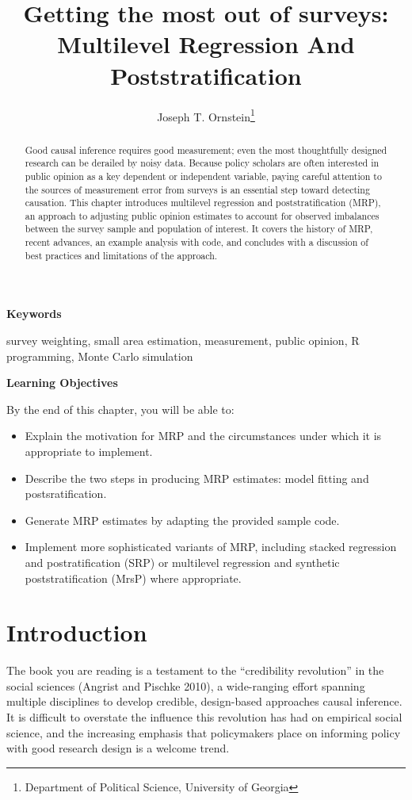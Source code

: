 \documentclass[
]{article}
\title{Getting the most out of surveys: Multilevel Regression And
Poststratification}
\author{Joseph T. Ornstein\footnote{Department of Political Science,
  University of Georgia}}
\date{}
\begin{document}
\maketitle
\begin{abstract}
Good causal inference requires good measurement; even the most
thoughtfully designed research can be derailed by noisy data. Because
policy scholars are often interested in public opinion as a key
dependent or independent variable, paying careful attention to the
sources of measurement error from surveys is an essential step toward
detecting causation. This chapter introduces multilevel regression and
poststratification (MRP), an approach to adjusting public opinion
estimates to account for observed imbalances between the survey sample
and population of interest. It covers the history of MRP, recent
advances, an example analysis with code, and concludes with a discussion
of best practices and limitations of the approach.
\end{abstract}

\textbf{Keywords}

survey weighting, small area estimation, measurement, public opinion, R
programming, Monte Carlo simulation

\textbf{Learning Objectives}

By the end of this chapter, you will be able to:

\begin{itemize}
\item
  Explain the motivation for MRP and the circumstances under which it is
  appropriate to implement.
\item
  Describe the two steps in producing MRP estimates: model fitting and
  postsratification.
\item
  Generate MRP estimates by adapting the provided sample code.
\item
  Implement more sophisticated variants of MRP, including stacked
  regression and postratification (SRP) or multilevel regression and
  synthetic poststratification (MrsP) where appropriate.
\end{itemize}

\hypertarget{introduction}{%
\section{Introduction}\label{introduction}}

The book you are reading is a testament to the ``credibility
revolution'' in the social sciences (Angrist and Pischke 2010), a
wide-ranging effort spanning multiple disciplines to develop credible,
design-based approaches causal inference. It is difficult to overstate
the influence this revolution has had on empirical social science, and
the increasing emphasis that policymakers place on informing policy with
good research design is a welcome trend.
\end{document}
